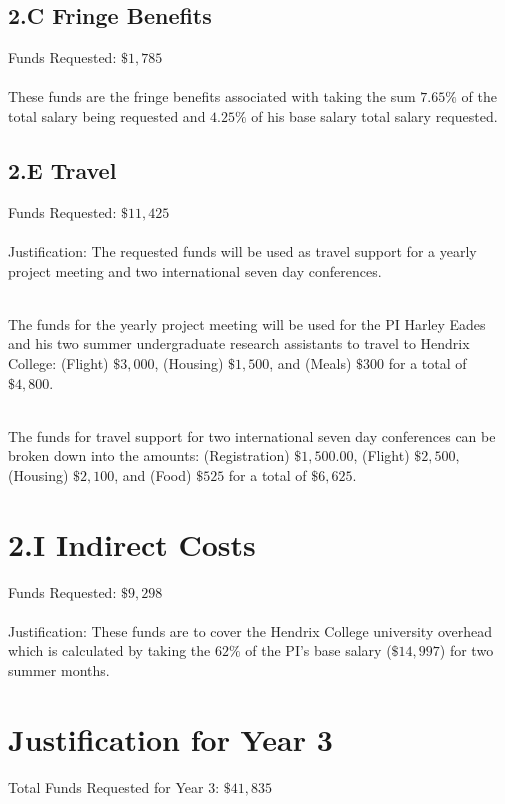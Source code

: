 \documentclass[11pt]{article}
\begin{document}
\subsection*{2.C Fringe Benefits}
\label{subsec:c_fringe_benefits}
Funds Requested: $\$1,785$\\ \ \\ These funds are the fringe benefits
associated with taking the sum $7.65\%$ of the total salary being
requested and $4.25\%$ of his base salary total salary requested.

\subsection*{2.E Travel}
\label{subsec:travel}
Funds Requested: $\$11,425$\\ \ \\ Justification: The requested funds
will be used as travel support for a yearly project meeting and two
international seven day conferences.

\ \\ The funds for the yearly project meeting will be used for the PI
Harley Eades and his two summer undergraduate research assistants to
travel to Hendrix College: (Flight) $\$3,000$, (Housing) $\$1,500$,
and (Meals) $\$300$ for a total of $\$4,800$.

\ \\ The funds for travel support for two international seven day
conferences can be broken down into the amounts: (Registration)
$\$1,500.00$, (Flight) $\$2,500$, (Housing) $\$2,100$, and (Food)
$\$525$ for a total of $\$6,625$.

\section*{2.I Indirect Costs}
\label{sec:2.i_indirect_costs}
Funds Requested: $\$9,298$\\ \ \\ Justification: These funds are to
cover the Hendrix College university overhead which is calculated by
taking the $62\%$ of the PI's base salary ($\$14,997$) for two
summer months.

\section{Justification for Year 3}
\label{sec:justification_for_year_3}
Total Funds Requested for Year 3: $\$41,835$\\
\vspace{-20px}
\end{document}
